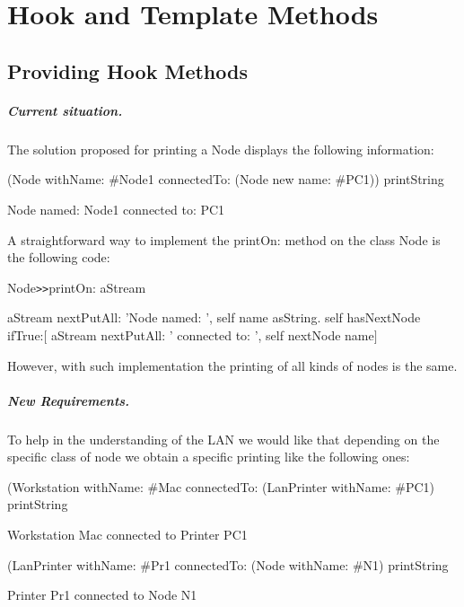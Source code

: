 \chapter{ Hook and Template Methods}



\section{Providing Hook Methods}



\paragraph{Current situation. }


The solution proposed for printing a Node displays the following 
information: 

\begin{code}
(Node withName: \#Node1 connectedTo: (Node new name: \#PC1)) printString

      Node named: Node1 connected to: PC1
\end{code}

A straightforward way to implement the printOn: method on the 
class Node is the following code:

\begin{code}
Node\texttt{>>}printOn: aStream

 aStream nextPutAll: 'Node named: ', self name asString.
 self hasNextNode 
  ifTrue:\ensuremath{[} aStream nextPutAll: ' connected to: ', self nextNode name\ensuremath{]}
\end{code}

However, with such implementation the printing of all kinds of 
nodes is the same.



\paragraph{New Requirements.}
To help in the understanding of the LAN we would like that depending 
on the specific class of node we obtain a specific printing like 
the following ones:

\begin{code}
 (Workstation withName: \#Mac connectedTo: (LanPrinter withName: 
\#PC1) printString

   Workstation Mac connected to Printer PC1

(LanPrinter withName: \#Pr1 connectedTo: (Node withName: \#N1) 
printString

 Printer Pr1 connected to Node N1
\end{code}

